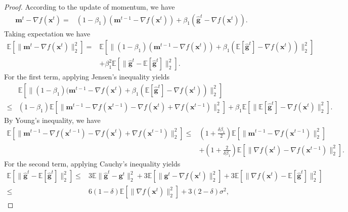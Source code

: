 \begin{proof}
    According to the update of momentum, we have
    \begin{align}
        \mathbf{m}^{t}-\nabla f(\mathbf{x}^{t})=&(1-\beta_1)(\mathbf{m}^{t-1}-\nabla f(\mathbf{x}^{t}))+\beta_1(\hat{\mathbf{g}}^t-\nabla f(\mathbf{x}^t)).\nonumber
    \end{align}
    Taking expectation we have
    \begin{align}
        \mathbb{E}[\|\mathbf{m}^t-\nabla f(\mathbf{x}^t)\|_2^2]=&\mathbb{E}[\|(1-\beta_1)(\mathbf{m}^{t-1}-\nabla f(\mathbf{x}^t))+\beta_1(\mathbb{E}[\hat{\mathbf{g}}^t]-\nabla f(\mathbf{x}^t))\|_2^2]\nonumber\\
        &+\beta_1^2\mathbb{E}[\|\hat{\mathbf{g}}^t-\mathbb{E}[\hat{\mathbf{g}}^t]\|_2^2].\label{eq:pflm-m-1}
    \end{align}
    For the first term, applying Jensen's inequality yields
    \begin{align}
        &\mathbb{E}[\|(1-\beta_1)(\mathbf{m}^{t-1}-\nabla f(\mathbf{x}^t)+\beta_1(\mathbb{E}[\hat{\mathbf{g}}^t]-\nabla f(\mathbf{x}^t))\|_2^2]\nonumber\\
        \le&(1-\beta_1)\mathbb{E}[\|\mathbf{m}^{t-1}-\nabla f(\mathbf{x}^{t-1})-\nabla f(\mathbf{x}^t)+\nabla f(\mathbf{x}^{t-1})\|_2^2]+\beta_1\mathbb{E}[\|\mathbb{E}[\hat{\mathbf{g}}^t]-\nabla f(\mathbf{x}^t)\|_2^2].\label{eq:pflm-m-2}
    \end{align}
    By Young's inequality, we have
    \begin{align}
        \mathbb{E}[\|\mathbf{m}^{t-1}-\nabla f(\mathbf{x}^{t-1})-\nabla f(\mathbf{x}^t)+\nabla f(\mathbf{x}^{t-1})\|_2^2]\le&\left(1+\frac{\delta\beta_1}{2}\right)\mathbb{E}[\|\mathbf{m}^{t-1}-\nabla f(\mathbf{x}^{t-1})\|_2^2]\nonumber\\
        &+\left(1+\frac{2}{\delta\beta_1}\right)\mathbb{E}[\|\nabla f(\mathbf{x}^t)-\nabla f(\mathbf{x}^{t-1})\|_2^2].\label{eq:pflm-m-3}
    \end{align}
    For the second term, applying Cauchy's inequality yields
    \begin{align}
        \mathbb{E}[\|\hat{\mathbf{g}}^t-\mathbb{E}[\hat{\mathbf{g}}^t]\|_2^2]\le&3\mathbb{E}\|\hat{\mathbf{g}}^t-\mathbf{g}^t\|_2^2+3\mathbb{E}[\|\mathbf{g}^t-\nabla f(\mathbf{x}^t)\|_2^2]+3\mathbb{E}[\|\nabla f(\mathbf{x}^t)-\mathbb{E}[\hat{\mathbf{g}}^t]\|_2^2]\nonumber\\
        \le&6(1-\delta)\mathbb{E}[\|\nabla f(\mathbf{x}^t)\|_2^2]+3(2-\delta)\sigma^2,\label{eq:pflm-m-4}

\end{align}
\end{proof}
